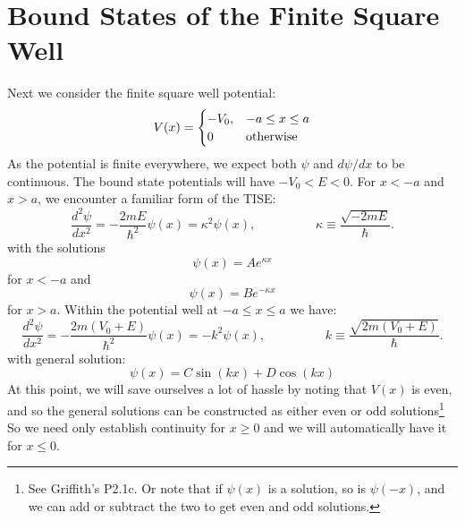 \documentclass[12pt]{book}
\begin{document}
\section{Bound States of the Finite Square Well}

Next we consider the finite square well potential:
$$V(x) = \begin{cases}
-V_0, & -a \leq x \leq a \\
0     & {\rm otherwise} \\
\end{cases}
$$
As the potential is finite everywhere, we expect both $\psi$ and $d\psi/dx$ to be continuous.
The bound state potentials will have $-V_0 < E < 0$.  For $x < -a$ and $x > a$, we encounter a familiar form of the TISE:
\begin{equation*}
\frac{d^2 \psi}{d x^2} = -\frac{2mE}{\hbar^2}\psi(x) = \kappa^2 \psi(x), \hspace{2cm} \kappa \equiv \frac{\sqrt{-2mE}}{\hbar}.
\end{equation*}
with the solutions
$$\psi(x) = A e^{\displaystyle \kappa x}$$
for $x<-a$ and
$$\psi(x) = B e^{\displaystyle -\kappa x}$$
for $x>a$.  Within the potential well at $-a \leq x \leq a$ we have:
\begin{equation*}
\frac{d^2 \psi}{d x^2} = -\frac{2m(V_0+E)}{\hbar^2}\psi(x) = -k^2 \psi(x), \hspace{2cm} k \equiv \frac{\sqrt{2m(V_0 + E)}}{\hbar}.
\end{equation*}
with general solution:
$$\psi(x) = C \sin(kx) + D \cos(kx)$$
At this point, we will save ourselves a lot of hassle by noting that $V(x)$ is even, and so the general solutions can be constructed as either even or odd solutions\footnote{See Griffith's P2.1c.  Or note that if $\psi(x)$ is a solution, so is $\psi(-x)$, and we can add or subtract the two to get even and odd solutions.}  So we need only establish continuity for $x \geq 0$ and we will automatically have it for $x \leq 0$.
\end{document}
